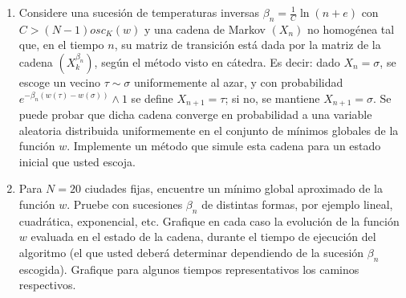 \begin{enumerate}
	
	\item Considere una sucesión de temperaturas inversas $\beta_n = \frac{1}{C}\ln(n+e)$ con $C>(N-1)osc_{K}(w)$ y una cadena de Markov $(X_n)$ no homogénea tal que, en el tiempo $n$, su matriz de transición está dada por la matriz de la cadena $(X_k^{\beta_n})$, según el método visto en cátedra. Es decir: dado $X_n = \sigma$, se escoge un vecino $\tau \sim \sigma$ uniformemente al azar, y con probabilidad $e^{-\beta_n (w(\tau) - w(\sigma))} \wedge 1$ se define $X_{n+1} = \tau$; si no, se mantiene $X_{n+1} = \sigma$. Se puede probar que dicha
	cadena converge en probabilidad a una variable aleatoria distribuida uniformemente en el conjunto de mínimos globales de la función $w$. Implemente un método que simule esta cadena para un
	estado inicial que usted escoja.
	
      \item Para $N=20$ ciudades fijas, encuentre un mínimo global aproximado de la función $w$. Pruebe con sucesiones $\beta_n$ de distintas formas, por ejemplo lineal, cuadrática, exponencial, etc. Grafique en cada caso la evolución de la función $w$ evaluada en el estado de la cadena, durante el tiempo de ejecución del algoritmo (el que usted deberá determinar dependiendo de la sucesión $\beta_n$ escogida). Grafique para algunos tiempos representativos los caminos respectivos.
\end{enumerate}